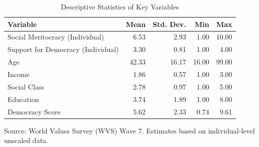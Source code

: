 \begin{table}[!h]
\centering
\caption{Descriptive Statistics of Key Variables}
\centering
\begin{threeparttable}
\fontsize{10}{12}\selectfont
\begin{tabular}[t]{lrrrr}
\toprule
Variable & Mean & Std. Dev. & Min & Max\\
\midrule
Social Meritocracy (Individual) & 6.53 & 2.93 & 1.00 & 10.00\\
Support for Democracy (Individual) & 3.30 & 0.81 & 1.00 & 4.00\\
Age & 42.33 & 16.17 & 16.00 & 99.00\\
Income & 1.86 & 0.57 & 1.00 & 3.00\\
Social Class & 2.78 & 0.97 & 1.00 & 5.00\\
Education & 3.74 & 1.89 & 1.00 & 8.00\\
Democracy Score & 5.62 & 2.33 & 0.74 & 9.61\\
\bottomrule
\end{tabular}
\begin{tablenotes}
\small
\item Source: World Values Survey (WVS) Wave 7. Estimates based on individual-level unscaled data.
\end{tablenotes}
\end{threeparttable}
\end{table}
